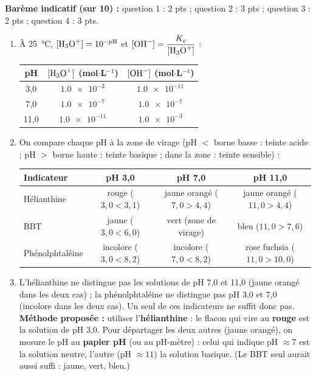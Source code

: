 \documentclass[11pt]{article}
\begin{document}
\begin{corrige}
\textbf{Barème indicatif (sur 10) :} question 1 : 2 pts ; question 2 : 3 pts ; question 3 : 2 pts ; question 4 : 3 pts.

\begin{enumerate}
    \item À \SI{25}{\celsius}, $[\ce{H3O+}] = 10^{-\text{pH}}$ et $[\ce{OH-}] = \dfrac{K_e}{[\ce{H3O+}]}$ :
    \begin{center}
    \begin{tabular}{|c|c|c|}
    \hline
    \rowcolor{popblueL} \textbf{pH} & \textbf{$[\ce{H3O+}]$ (mol$\cdot$L$^{-1}$)} & \textbf{$[\ce{OH-}]$ (mol$\cdot$L$^{-1}$)} \\
    \hline
    3,0 & $\num{1,0e-3}$ & $\num{1,0e-11}$ \\
    7,0 & $\num{1,0e-7}$ & $\num{1,0e-7}$ \\
    11,0 & $\num{1,0e-11}$ & $\num{1,0e-3}$ \\
    \hline
    \end{tabular}
    \end{center}
    \item On compare chaque pH à la zone de virage (pH $<$ borne basse : teinte acide ; pH $>$ borne haute : teinte basique ; dans la zone : teinte sensible) :
    \begin{center}
    \begin{tabular}{|l|c|c|c|}
    \hline
    \rowcolor{popblueL} \textbf{Indicateur} & \textbf{pH 3,0} & \textbf{pH 7,0} & \textbf{pH 11,0} \\
    \hline
    Hélianthine & rouge ($3{,}0 < 3{,}1$) & jaune orangé ($7{,}0 > 4{,}4$) & jaune orangé ($11{,}0 > 4{,}4$) \\
    \hline
    BBT & jaune ($3{,}0 < 6{,}0$) & vert (zone de virage) & bleu ($11{,}0 > 7{,}6$) \\
    \hline
    Phénolphtaléine & incolore ($3{,}0 < 8{,}2$) & incolore ($7{,}0 < 8{,}2$) & rose fuchsia ($11{,}0 > 10{,}0$) \\
    \hline
    \end{tabular}
    \end{center}
    \item L'hélianthine ne distingue pas les solutions de pH 7,0 et 11,0 (jaune orangé dans les deux cas) ; la phénolphtaléine ne distingue pas pH 3,0 et 7,0 (incolore dans les deux cas). Un seul de ces indicateurs ne suffit donc pas.
    \textbf{Méthode proposée :} utiliser l'\textbf{hélianthine} : le flacon qui vire au \textbf{rouge} est la solution de pH 3,0. Pour départager les deux autres (jaune orangé), on mesure le pH au \textbf{papier pH} (ou au pH-mètre) : celui qui indique pH $\approx 7$ est la solution neutre, l'autre (pH $\approx 11$) la solution basique. (Le BBT seul aurait aussi suffi : jaune, vert, bleu.)

\end{enumerate}
\end{corrige}
\end{document}
